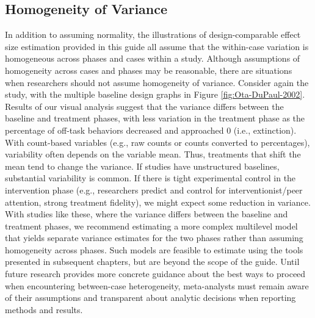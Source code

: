 \documentclass[
]{book}
\begin{document}
\hypertarget{homogeneity-of-variance}{%
\subsection{Homogeneity of Variance}\label{homogeneity-of-variance}}

In addition to assuming normality, the illustrations of design-comparable effect size estimation provided in this guide all assume that the within-case variation is homogeneous across phases and cases within a study. Although assumptions of homogeneity across cases and phases may be reasonable, there are situations when researchers should not assume homogeneity of variance.
Consider again the \citet{ota2002Task} study, with the multiple baseline design graphs in Figure \ref{fig:Ota-DuPaul-2002}. Results of our visual analysis suggest that the variance differs between the baseline and treatment phases, with less variation in the treatment phase as the percentage of off-task behaviors decreased and approached 0 (i.e., extinction). With count-based variables (e.g., raw counts or counts converted to percentages), variability often depends on the variable mean. Thus, treatments that shift the mean tend to change the variance. If studies have unstructured baselines, substantial variability is common. If there is tight experimental control in the intervention phase (e.g., researchers predict and control for interventionist/peer attention, strong treatment fidelity), we might expect some reduction in variance. With studies like these, where the variance differs between the baseline and treatment phases, we recommend estimating a more complex multilevel model that yields separate variance estimates for the two phases rather than assuming homogeneity across phases. Such models are feasible to estimate using the tools presented in subsequent chapters, but are beyond the scope of the guide. Until future research provides more concrete guidance about the best ways to proceed when encountering between-case heterogeneity, meta-analysts must remain aware of their assumptions and transparent about analytic decisions when reporting methods and results.
\end{document}
